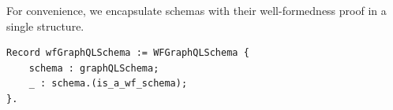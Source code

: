 
For convenience, we encapsulate schemas with their well-formedness
proof in a single structure. 

%

\begin{verbatim}
Record wfGraphQLSchema := WFGraphQLSchema {
    schema : graphQLSchema;
    _ : schema.(is_a_wf_schema);
}.
\end{verbatim}




